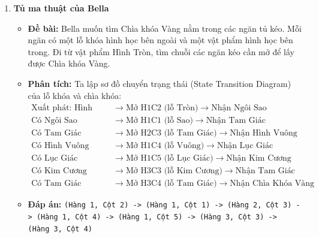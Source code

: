 \documentclass[11pt,a4paper]{article}
\begin{document}
\begin{enumerate}[label=\textbf{Câu \arabic*:}, leftmargin=*]
\item \textbf{Tủ ma thuật của Bella}
    \begin{itemize}
        \item \textbf{Đề bài:} Bella muốn tìm Chìa khóa Vàng nằm trong các ngăn tủ kéo. Mỗi ngăn có một lỗ khóa hình học bên ngoài và một vật phẩm hình học bên trong. Đi từ vật phẩm Hình Tròn, tìm chuỗi các ngăn kéo cần mở để lấy được Chìa khóa Vàng.
        \item \textbf{Phân tích:}
            Ta lập sơ đồ chuyển trạng thái (State Transition Diagram) của lỗ khóa và chìa khóa:
            \begin{align*}
                \text{Xuất phát: Hình Tròn} &\to \text{Mở H1C2 (lỗ Tròn)} \to \text{Nhận Ngôi Sao} \\
                \text{Có Ngôi Sao} &\to \text{Mở H1C1 (lỗ Sao)} \to \text{Nhận Tam Giác} \\
                \text{Có Tam Giác} &\to \text{Mở H2C3 (lỗ Tam Giác)} \to \text{Nhận Hình Vuông} \\
                \text{Có Hình Vuông} &\to \text{Mở H1C4 (lỗ Vuông)} \to \text{Nhận Lục Giác} \\
                \text{Có Lục Giác} &\to \text{Mở H1C5 (lỗ Lục Giác)} \to \text{Nhận Kim Cương} \\
                \text{Có Kim Cương} &\to \text{Mở H3C3 (lỗ Kim Cương)} \to \text{Nhận Tam Giác} \\
                \text{Có Tam Giác} &\to \text{Mở H3C4 (lỗ Tam Giác)} \to \text{Nhận Chìa Khóa Vàng}
            \end{align*}
        \item \textbf{Đáp án:} \texttt{(Hàng 1, Cột 2) -> (Hàng 1, Cột 1) -> (Hàng 2, Cột 3) -> (Hàng 1, Cột 4) -> (Hàng 1, Cột 5) -> (Hàng 3, Cột 3) -> (Hàng 3, Cột 4)}
    \end{itemize}

\end{enumerate}
\end{document}
